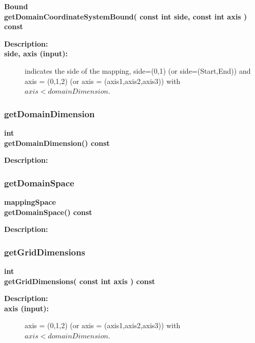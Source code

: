 \begin{flushleft} \textbf{%
Bound  \\ 
\settowidth{\MappingIncludeArgIndent}{getDomainCoordinateSystemBound(}%
getDomainCoordinateSystemBound( const int side, const int axis ) const
}\end{flushleft}
\begin{description}
\item[{\bf Description:}] 
\item[{\bf side, axis (input):}]  indicates the side of the mapping, side=(0,1) (or side=(Start,End)) 
     and axis = (0,1,2) (or axis = (axis1,axis2,axis3)) with $axis<domainDimension$.
\end{description}
\subsubsection{getDomainDimension}
 
\begin{flushleft} \textbf{%
int  \\ 
\settowidth{\MappingIncludeArgIndent}{getDomainDimension(}%
getDomainDimension() const 
}\end{flushleft}
\begin{description}
\item[{\bf Description:}] 
\end{description}
\subsubsection{getDomainSpace}
 
\begin{flushleft} \textbf{%
mappingSpace  \\ 
\settowidth{\MappingIncludeArgIndent}{getDomainSpace(}%
getDomainSpace() const 
}\end{flushleft}
\begin{description}
\item[{\bf Description:}] 
\end{description}
\subsubsection{getGridDimensions}
 
\begin{flushleft} \textbf{%
int  \\ 
\settowidth{\MappingIncludeArgIndent}{getGridDimensions(}%
getGridDimensions( const int axis ) const
}\end{flushleft}
\begin{description}
\item[{\bf Description:}] 
\item[{\bf axis (input):}]  axis = (0,1,2) (or axis = (axis1,axis2,axis3)) with $axis<domainDimension$.
\end{description}
